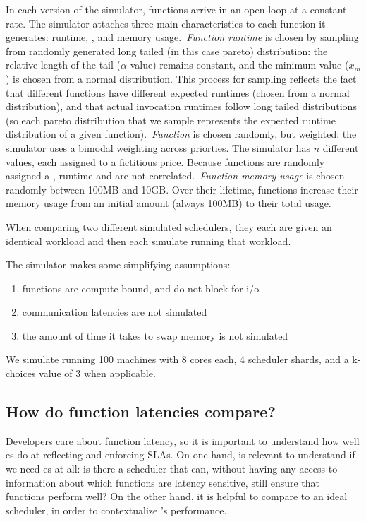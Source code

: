 In each version of the simulator, functions arrive in an open loop at a constant
rate. The simulator attaches three main characteristics to each function it
generates: runtime, \priceclass{}, and memory usage.\ \textit{Function runtime}
is chosen by sampling from randomly generated long tailed (in this case pareto)
distribution: the relative length of the tail ($\alpha$ value) remains constant,
and the minimum value ($x_m$) is chosen from a normal distribution. This process
for sampling reflects the fact that different functions have different expected
runtimes (chosen from a normal distribution), and that actual invocation
runtimes follow long tailed distributions (so each pareto distribution that we
sample represents the expected runtime distribution of a given function).\
\textit{Function \class{}} is chosen randomly, but weighted: the simulator uses
a bimodal weighting across priorties. The simulator has $n$ different
\priceclass{} values, each assigned to a fictitious price. Because functions are
randomly assigned a \class{}, runtime and \class{} are not correlated.\
\textit{Function memory usage} is chosen randomly between 100MB and 10GB. Over
their lifetime, functions increase their memory usage from an initial amount
(always 100MB) to their total usage.

When comparing two different simulated schedulers, they each are given an
identical workload and then each simulate running that workload.

The simulator makes some simplifying assumptions:
\begin{enumerate}
    \item functions are compute bound, and do not block for i/o
    \item communication latencies are not simulated
    \item the amount of time it takes to swap memory is not simulated
\end{enumerate}

We simulate running 100 machines with 8 cores each, 4 scheduler shards, and a
k-choices value of 3 when applicable.

\subsection{How do function latencies compare?}

Developers care about function latency, so it is important to understand how
well \priceclass{}es do at reflecting and enforcing SLAs. On one hand, is
relevant to understand if we need \class{}es at all: is there a scheduler that
can, without having any access to information about which functions are latency
sensitive, still ensure that functions perform well? On the other hand, it is
helpful to compare \sys{} to an ideal scheduler, in order to contextualize
\sys{}'s performance.

